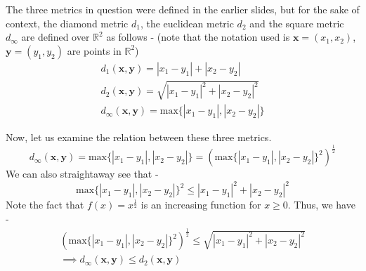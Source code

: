 \begin{frame}
    The three metrics in question were defined in the earlier slides, but for the sake of context, the diamond metric $d_1$, the euclidean metric $d_2$ and the square metric $d_\infty$ are defined over $\mathbb{R}^2$ as follows - (note that the notation used is $\boldsymbol{x} = (x_1, x_2)$, $\boldsymbol{y} = (y_1, y_2)$ are points in $\mathbb{R}^2$)
    \begin{gather*}
        d_1(\boldsymbol{x}, \boldsymbol{y}) = |x_1 - y_1| + |x_2 - y_2| \\
        d_2(\boldsymbol{x}, \boldsymbol{y}) = \sqrt{|x_1 - y_1|^2 + |x_2 - y_2|^2} \\
        d_\infty(\boldsymbol{x}, \boldsymbol{y}) = \text{max} \{|x_1 - y_1|, |x_2 - y_2|\}
    \end{gather*}
\end{frame}

\begin{frame}
    Now, let us examine the relation between these three metrics.
    \begin{equation*}
        d_\infty(\boldsymbol{x}, \boldsymbol{y}) = \text{max} \{|x_1 - y_1|, |x_2 - y_2|\} = \left(\text{max} \{|x_1 - y_1|, |x_2 - y_2|\}^2 \right)^{\frac{1}{2}}
    \end{equation*}
    We can also straightaway see that -
    \begin{equation*}
        \text{max} \{|x_1 - y_1|, |x_2 - y_2|\}^2 \leq |x_1 - y_1|^2 + |x_2 - y_2|^2
    \end{equation*}
    Note the fact that $f(x) = x^{\frac{1}{2}}$ is an increasing function for $x \geq 0$. Thus, we have -
    \begin{gather*}
        \left(\text{max} \{|x_1 - y_1|, |x_2 - y_2|\}^2 \right)^{\frac{1}{2}} \leq \sqrt{|x_1 - y_1|^2 + |x_2 - y_2|^2} \\
        \implies d_\infty(\boldsymbol{x}, \boldsymbol{y}) \leq d_2(\boldsymbol{x}, \boldsymbol{y})
    \end{gather*} 
\end{frame}

